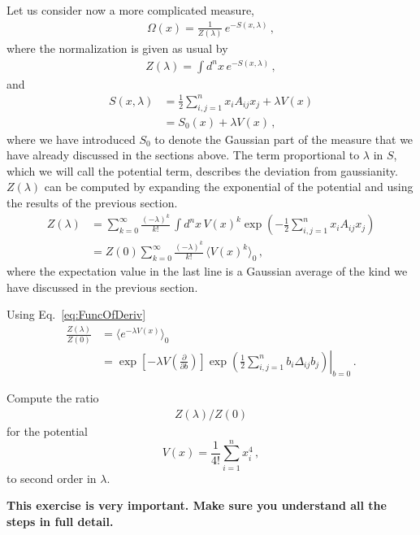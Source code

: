 \documentclass[notes.tex]{subfiles}
\begin{document}
Let us consider now a more complicated measure, 
\begin{align}
  \label{eq:PertGaussMeas}
  \Omega(x) = \frac{1}{Z(\lambda)}\, e^{-S(x,\lambda)}\, ,
\end{align}
where the normalization is given as usual by
\begin{align}
  \label{eq:PertGaussNorm}
  Z(\lambda) = \int d^nx\, e^{-S(x,\lambda)}\, ,
\end{align}
and 
\begin{align}
  \label{eq:PertGaussAction}
  S(x,\lambda) &= \frac12 \sum_{i,j=1}^n x_i A_{ij} x_j + 
  \lambda V(x) \\
  &= S_0(x) + \lambda V(x)\, ,
\end{align}
where we have introduced $S_0$ to denote the Gaussian part of the
measure that we have already discussed in the sections above.  The
term proportional to $\lambda$ in $S$, which we will call the
potential term, describes the deviation from gaussianity.
$Z(\lambda)$ can be computed by expanding the exponential of the
potential and using the results of the previous section.
\begin{align}
  Z(\lambda) &= \sum_{k=0}^\infty \frac{(-\lambda)^k}{k!}\, 
               \int d^nx\, V(x)^k  \exp\left(
    -\frac12 \sum_{i,j=1}^n x_i A_{ij} x_j
    \right) \\
  &= Z(0) \sum_{k=0}^\infty \frac{(-\lambda)^k}{k!}\,
    \langle V(x)^k\rangle_0\, ,
\end{align}
where the expectation value in the last line is a Gaussian average of the kind we have discussed in the previous section. 

Using Eq.~\ref{eq:FuncOfDeriv} 
\begin{align}
  \frac{Z(\lambda)}{Z(0)} &= \langle e^{-\lambda V(x)} \rangle_0 \\
  &= \exp\left[-\lambda V\left(\frac{\partial}{\partial b}\right)\right]
    \left. \exp\left(
    \frac12 \sum_{i,j=1}^n b_i \Delta_{ij} b_j
  \right) \right|_{b=0}\, .
\end{align}

\begin{Ex}
  Compute the ratio 
\begin{align}
  Z(\lambda)/Z(0)
\end{align}
for the potential 
\begin{equation}
  \label{eq:QuarticPot}
  V(x) = \frac{1}{4!} \sum_{i=1}^n x_i^4\, ,
\end{equation}
to second order in $\lambda$.

\noindent\textbf{ 
This exercise is very important. Make sure you understand all the steps in full detail. }
\end{Ex}
\end{document}
